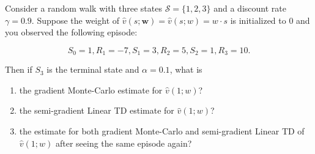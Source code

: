 Consider a random walk with three states $\mathcal{S} = \{1,2,3 \}$ and a discount rate $\gamma = 0.9$.
Suppose the weight of $\hat v(s;\mathbf{w}) = \hat v(s;w) = w\cdot s$ is initialized to 0 and you observed the
following episode:

\[
    S_0 = 1, R_1 = -7, S_1 = 3,  R_2 = 5, S_2 = 1, R_3 = 10.
\]

Then if $S_{3}$ is the terminal state and $\alpha = 0.1$, what is
\begin{enumerate}
    \item the gradient Monte-Carlo estimate for $\hat v(1 ; w)$?
    \item the semi-gradient Linear TD estimate for $\hat v(1 ; w)$?
    \item the estimate for both gradient Monte-Carlo and semi-gradient Linear TD of $\hat v(1 ; w)$ after seeing the same episode again?
\end{enumerate}

%
%

